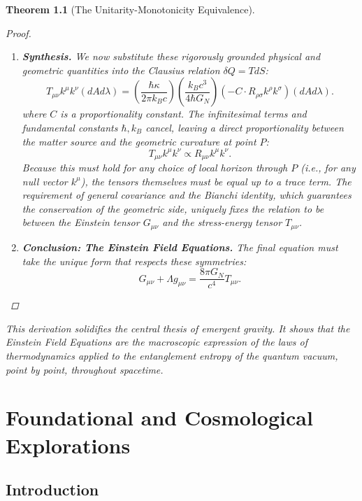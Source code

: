 \documentclass[11pt, letterpaper]{report}
\theoremstyle{plain} %
\newtheorem{theorem}{Theorem}[chapter]
\theoremstyle{definition} %
\theoremstyle{remark} %
\begin{document}
\begin{theorem}[The Unitarity-Monotonicity Equivalence]
\begin{proof}
\begin{enumerate}
    \item \textbf{Synthesis.} We now substitute these rigorously grounded physical and geometric quantities into the Clausius relation $\delta Q = T dS$:
    $$
    T_{\mu\nu}k^\mu k^\nu (dA d\lambda) = \left(\frac{\hbar \kappa}{2\pi k_B c}\right) \left( \frac{k_B c^3}{4\hbar G_N} \right) \left( -C \cdot R_{\rho\sigma}k^\rho k^\sigma \right) (dA d\lambda).
    $$
    where $C$ is a proportionality constant. The infinitesimal terms and fundamental constants $\hbar, k_B$ cancel, leaving a direct proportionality between the matter source and the geometric curvature at point $P$:
    \begin{equation}
        T_{\mu\nu}k^\mu k^\nu \propto R_{\mu\nu}k^\mu k^\nu.
    \end{equation}
    Because this must hold for any choice of local horizon through $P$ (i.e., for any null vector $k^\mu$), the tensors themselves must be equal up to a trace term. The requirement of general covariance and the Bianchi identity, which guarantees the conservation of the geometric side, uniquely fixes the relation to be between the Einstein tensor $G_{\mu\nu}$ and the stress-energy tensor $T_{\mu\nu}$.

    \item \textbf{Conclusion: The Einstein Field Equations.} The final equation must take the unique form that respects these symmetries:
    \begin{equation}
        G_{\mu\nu} + \Lambda g_{\mu\nu} = \frac{8\pi G_N}{c^4} T_{\mu\nu}.
    \end{equation}
\end{enumerate}
\end{proof}
This derivation solidifies the central thesis of emergent gravity. It shows that the Einstein Field Equations are the macroscopic expression of the laws of thermodynamics applied to the entanglement entropy of the quantum vacuum, point by point, throughout spacetime.









\chapter{Foundational and Cosmological Explorations}
\label{chap:explorations}

\section{Introduction}


\end{theorem}
\end{document}
